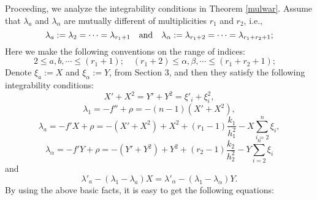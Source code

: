 \documentclass{amsart}
\theoremstyle{definition}
\theoremstyle{remark}
\numberwithin{equation}{section}
\begin{document}
\medskip	
Proceeding, we analyze the integrability conditions in Theorem \ref{mulwar}.
Assume that $\lambda_a$ and $\lambda_\alpha$ are mutually different of multiplicities $r_1$ and $r_2$, i.e.,
\[
\lambda_{a}:=\lambda_{2}= \cdots= \lambda_{r_1+1} \quad {\rm and} \quad
\lambda_{\alpha}:=\lambda_{r_1+2}= \cdots=\lambda_{r_1+r_2+1};
\]
Here we make the following conventions on the range of indices:
\[
2 \leq a, b,  \cdots\leq ({r_1+1}); \quad ({r_1+2}) \leq \alpha, \beta,  \cdots\leq ({r_1+r_2+1});\quad 
\] 
Denote $\xi_a:=X$ and $ \xi_\alpha:=Y$, from Section 3, and then they satisfy the following integrability conditions:
\begin{equation}\label{4.1}
X'+X^2=Y'+Y^2=\xi'_i+\xi^2_i,
\end{equation}
\begin{equation}\label{4.2}
\lambda_{1}=-f''+\rho=-(n-1)\left( X'+X^2 \right),
\end{equation}
\begin{equation}\label{4.3}
\lambda_{a}=-f'X+\rho=-( X'+X^2)+X^2+(r_1-1)\frac{k_1}{h^2_1} 
-X\sum^n_{i=2}\xi_i,
\end{equation}
\begin{equation}\label{4.4}
\lambda_{\alpha}=-f'Y+\rho=-(Y'+Y^2)+Y^2+(r_2-1)\frac{k_2}{h^2_2}
-Y\sum^n_{i=2}\xi_i
\end{equation}
 and 
\begin{equation}\label{4.5}
\lambda'_a-\left(\lambda_1-\lambda_a \right)X=\lambda'_\alpha-\left(\lambda_1-\lambda_\alpha \right)Y.
\end{equation}
By using the above basic facts, it is easy to get the following equations:
\end{document}
